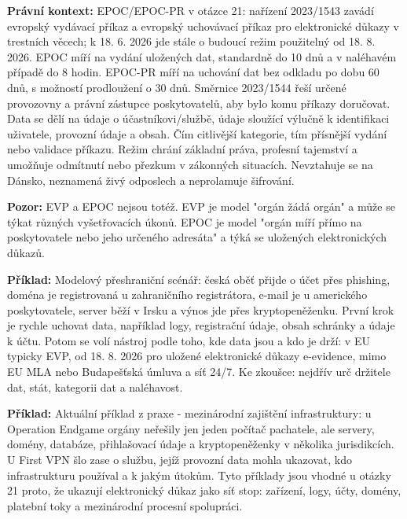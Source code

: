\documentclass[11pt,a4paper]{article}
\newcommand{\pozor}[1]{\begin{tcolorbox}[breakable,enhanced,colback=red!7,colframe=red!30!black,boxrule=0pt,arc=1mm,left=5pt,right=5pt,top=5pt,bottom=5pt,before skip=6pt,after skip=6pt]\textbf{Pozor:} #1\end{tcolorbox}}
\newcommand{\priklad}[1]{\begin{tcolorbox}[breakable,enhanced,colback=green!7,colframe=green!30!black,boxrule=0pt,arc=1mm,left=5pt,right=5pt,top=5pt,bottom=5pt,before skip=6pt,after skip=6pt]\textbf{Příklad:} #1\end{tcolorbox}}
\newcommand{\pravobox}[1]{\begin{tcolorbox}[breakable,enhanced,colback=yellow!18,colframe=yellow!45!black,boxrule=0pt,arc=1mm,left=5pt,right=5pt,top=5pt,bottom=5pt,before skip=6pt,after skip=6pt]\textbf{Právní kontext:} #1\end{tcolorbox}}
\begin{document}
\pravobox{EPOC/EPOC-PR v otázce 21: nařízení 2023/1543 zavádí evropský vydávací příkaz a evropský uchovávací příkaz pro elektronické důkazy v trestních věcech; k 18. 6. 2026 jde stále o budoucí režim použitelný od 18. 8. 2026. EPOC míří na vydání uložených dat, standardně do 10 dnů a v naléhavém případě do 8 hodin. EPOC-PR míří na uchování dat bez odkladu po dobu 60 dnů, s možností prodloužení o 30 dnů. Směrnice 2023/1544 řeší určené provozovny a právní zástupce poskytovatelů, aby bylo komu příkazy doručovat. Data se dělí na údaje o účastníkovi/službě, údaje sloužící výlučně k identifikaci uživatele, provozní údaje a obsah. Čím citlivější kategorie, tím přísnější vydání nebo validace příkazu. Režim chrání základní práva, profesní tajemství a umožňuje odmítnutí nebo přezkum v zákonných situacích. Nevztahuje se na Dánsko, neznamená živý odposlech a neprolamuje šifrování.}

\pozor{EVP a EPOC nejsou totéž. EVP je model "orgán žádá orgán" a může se týkat různých vyšetřovacích úkonů. EPOC je model "orgán míří přímo na poskytovatele nebo jeho určeného adresáta" a týká se uložených elektronických důkazů.}

\priklad{Modelový přeshraniční scénář: česká oběť přijde o účet přes phishing, doména je registrovaná u zahraničního registrátora, e-mail je u amerického poskytovatele, server běží v Irsku a výnos jde přes kryptopeněženku. První krok je rychle uchovat data, například logy, registrační údaje, obsah schránky a údaje k účtu. Potom se volí nástroj podle toho, kde data jsou a kdo je drží: v EU typicky EVP, od 18. 8. 2026 pro uložené elektronické důkazy e-evidence, mimo EU MLA nebo Budapešťská úmluva a síť 24/7. Ke zkoušce: nejdřív urč držitele dat, stát, kategorii dat a naléhavost.}

\priklad{Aktuální příklad z praxe - mezinárodní zajištění infrastruktury: u Operation Endgame orgány neřešily jen jeden počítač pachatele, ale servery, domény, databáze, přihlašovací údaje a kryptopeněženky v několika jurisdikcích. U First VPN šlo zase o službu, jejíž provozní data mohla ukazovat, kdo infrastrukturu používal a k jakým útokům. Tyto příklady jsou vhodné u otázky 21 proto, že ukazují elektronický důkaz jako síť stop: zařízení, logy, účty, domény, platební toky a mezinárodní procesní spolupráci.}
\end{document}
